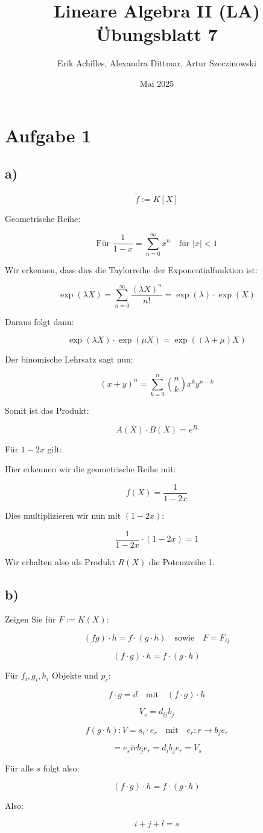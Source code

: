 \documentclass{article}
\title{Lineare Algebra II (LA) Übungsblatt 7}
\author{Erik Achilles, Alexandra Dittmar, Artur Szeczinowski}
\date{Mai 2025}
\begin{document}

\section*{Aufgabe 1}
\subsection*{a)}

\[
  \tilde{f} := K[X]
\]


Geometrische Reihe:

\[
  \text{Für } \frac{1}{1 - x} = \sum_{n=0}^{\infty} x^n \quad \text{für } |x| < 1
\]

Wir erkennen, dass dies die Taylorreihe der Exponentialfunktion ist:

\[
  \exp(\lambda X) = \sum_{n=0}^\infty \frac{(\lambda X)^n}{n!} = \exp(\lambda) \cdot \exp(X)
\]

Daraus folgt dann:

\[
  \exp(\lambda X) \cdot \exp(\mu X) = \exp((\lambda + \mu) X)
\]

Der binomische Lehrsatz sagt nun:

\[
  (x + y)^n = \sum_{k=0}^n \binom{n}{k} x^k y^{n-k}
\]

Somit ist das Produkt:

\[
  A(X) \cdot B(X) = e^B
\]

Für $1 - 2x$ gilt:

Hier erkennen wir die geometrische Reihe mit:

\[
  f(X) = \frac{1}{1 - 2x}
\]

Dies multiplizieren wir nun mit $(1 - 2x)$:

\[
  \frac{1}{1 - 2x} \cdot (1 - 2x) = 1
\]

Wir erhalten also als Produkt $R(X)$ die Potenzreihe 1.


\subsection*{b)}
Zeigen Sie für $F := K(X)$:

\[
  (fg) \cdot h = f \cdot (g \cdot h) \quad \text{sowie} \quad F = F_{ij}
\]

\[
  (f \cdot g) \cdot h = f \cdot (g \cdot h)
\]

Für $f_i, g_i, h_i$ Objekte und $p_e$:

\[
  f \cdot g = d \quad \text{mit} \quad (f \cdot g) \cdot h
\]

\[
  V_s = d_{ij} b_j
\]

\[
  f(g \cdot h): V = s_i \cdot e_r \quad \text{mit} \quad e_r: r \to b_j e_r
\]

\[
  = e_s i r b_j e_r = d_i b_j e_r = V_s
\]

Für alle $s$ folgt also:

\[
  (f \cdot g) \cdot h = f \cdot (g \cdot h)
\]

Also:

\[
  i + j + l = s
\]
\end{document}
